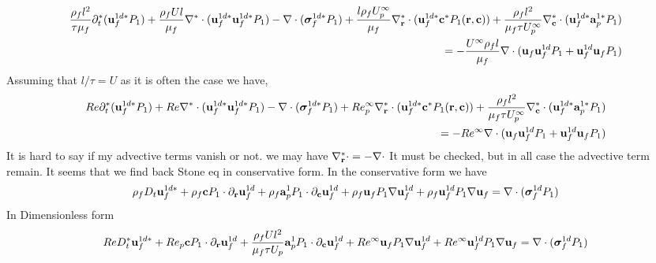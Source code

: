 \begin{align*}
    \frac{\rho_f l^2 }{\tau \mu_f}\partial_t^*( \textbf{u}_f^{1d*}  P_1)
    + \frac{\rho_f U l}{\mu_f }\mathbf{\nabla}^* \cdot (\textbf{u}_f^{1d*} \textbf{u}_f^{1d*}  P_1) 
    -  \mathbf{\nabla}\cdot (\bm\sigma_f^{1d*} P_1)
    + \frac{l \rho_f U^\infty_p}{\mu_f } \mathbf{\nabla}_\textbf{r}^* \cdot (  \textbf{u}_f^{1d*} \textbf{c}^*  P_1(\textbf{r},\textbf{c}) )
    +  \frac{\rho_f l^2}{\mu_f \tau U^\infty_p} \mathbf{\nabla}_\textbf{c}^* \cdot (  \textbf{u}_f^{1d*} \textbf{a}_p^{1*}  P_1 )\\
    = 
    -  \frac{U^\infty\rho_f l}{\mu_f } \mathbf{\nabla}\cdot ( \textbf{u}_f \textbf{u}_f^{1d}  P_1
        +  \textbf{u}_f^{1d} \textbf{u}_f  P_1)
\end{align*}
Assuming that $l/\tau = U$ as it is often the case we have, 
\begin{align*}
    Re \partial_t^*( \textbf{u}_f^{1d*}  P_1)
    + Re \mathbf{\nabla}^* \cdot (\textbf{u}_f^{1d*} \textbf{u}_f^{1d*}  P_1) 
    -  \mathbf{\nabla}\cdot (\bm\sigma_f^{1d*} P_1)
    + Re_p^\infty \mathbf{\nabla}_\textbf{r}^* \cdot (  \textbf{u}_f^{1d*} \textbf{c}^*  P_1(\textbf{r},\textbf{c}) )
    +  \frac{\rho_f l^2}{\mu_f \tau U^\infty_p} \mathbf{\nabla}_\textbf{c}^* \cdot (  \textbf{u}_f^{1d*} \textbf{a}_p^{1*}  P_1 )\\
    = 
    - Re^\infty \mathbf{\nabla}\cdot ( \textbf{u}_f \textbf{u}_f^{1d}  P_1
        +  \textbf{u}_f^{1d} \textbf{u}_f  P_1)
\end{align*}
It is hard to say if my advective terms vanish or not. 
we may have $\mathbf{\nabla}_\textbf{r}^* \cdot = - \mathbf{\nabla}\cdot$ 
It must be checked, but in all case the advective term remain. 
It seems that we find back Stone eq in conservative form. 
In the conservative form we have 
\begin{align*}
    \rho_f D_t  \textbf{u}_f^{1d*}  
    +  \rho_f  \textbf{c}  P_1   \cdot {\partial_\textbf{r}} \textbf{u}_f^{1d} 
    +  \rho_f  \textbf{a}_p^1  P_1   \cdot \partial_\textbf{c} \textbf{u}_f^{1d} 
    + \rho_f \textbf{u}_f  P_1 \mathbf{\nabla} \textbf{u}_f^{1d}
    +  \rho_f \textbf{u}_f^{1d} P_1 \mathbf{\nabla}\textbf{u}_f
    = 
    \mathbf{\nabla}\cdot ( \bm\sigma_f^{1d} P_1)
\end{align*}
In Dimensionless form 
\begin{align*}
    Re D_t^*  \textbf{u}_f^{1d*}  
    + Re_p  \textbf{c}  P_1   \cdot {\partial_\textbf{r}} \textbf{u}_f^{1d} 
    +  \frac{\rho_f U l^2 }{\mu_f \tau U_p}  \textbf{a}_p^1  P_1   \cdot \partial_\textbf{c} \textbf{u}_f^{1d} 
    + Re^\infty \textbf{u}_f  P_1 \mathbf{\nabla} \textbf{u}_f^{1d}
    + Re^\infty \textbf{u}_f^{1d} P_1 \mathbf{\nabla}\textbf{u}_f
    = 
    \mathbf{\nabla}\cdot ( \bm\sigma_f^{1d} P_1)
\end{align*}
